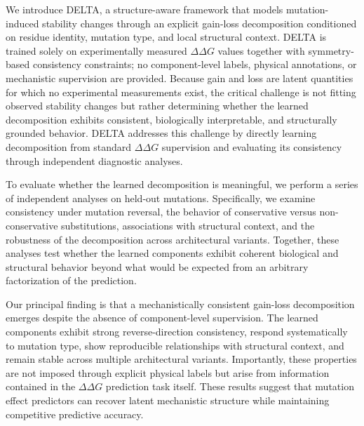\documentclass[11pt,a4paper]{article}
\theoremstyle{plain}
\theoremstyle{definition}
\begin{document}
We introduce DELTA, a structure-aware framework that models mutation-induced stability changes through an explicit gain-loss decomposition conditioned on residue identity, mutation type, and local structural context. DELTA is trained solely on experimentally measured $\Delta \Delta G$ values together with symmetry-based consistency constraints; no component-level labels, physical annotations, or mechanistic supervision are provided. Because gain and loss are latent quantities for which no experimental measurements exist, the critical challenge is not fitting observed stability changes but rather determining whether the learned decomposition exhibits consistent, biologically interpretable, and structurally grounded behavior. DELTA addresses this challenge by directly learning decomposition from standard $\Delta\Delta G$ supervision and evaluating its consistency through independent diagnostic analyses.

To evaluate whether the learned decomposition is meaningful, we perform a series of independent analyses on held-out mutations. Specifically, we examine consistency under mutation reversal, the behavior of conservative versus non-conservative substitutions, associations with structural context, and the robustness of the decomposition across architectural variants. Together, these analyses test whether the learned components exhibit coherent biological and structural behavior beyond what would be expected from an arbitrary factorization of the prediction.

Our principal finding is that a mechanistically consistent gain-loss decomposition emerges despite the absence of component-level supervision. The learned components exhibit strong reverse-direction consistency, respond systematically to mutation type, show reproducible relationships with structural context, and remain stable across multiple architectural variants. Importantly, these properties are not imposed through explicit physical labels but arise from information contained in the $\Delta\Delta G$ prediction task itself. These results suggest that mutation effect predictors can recover latent mechanistic structure while maintaining competitive predictive accuracy.
\end{document}
